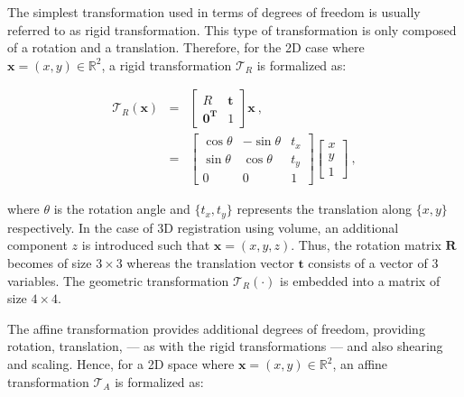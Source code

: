The simplest transformation used in terms of degrees of freedom is usually referred to as rigid transformation.
This type of transformation is only composed of a rotation and a translation.
Therefore, for the 2D case where $\mathbf{x} = (x,y) \in \mathbb{R}^2$, a rigid transformation $\mathcal{T}_R$ is formalized as:

\begin{eqnarray}
	\mathcal{T}_R(\mathbf{x}) & = & \begin{bmatrix}
		R & \mathbf{t} \\
		\mathbf{0^T} & 1
	\end{bmatrix} \mathbf{x} \ , \nonumber \\
	& = & \begin{bmatrix}
		\cos \theta & -\sin \theta & t_x \\
		\sin \theta & \cos \theta & t_y \\
		0 & 0 & 1
	\end{bmatrix}\begin{bmatrix}
		x \\
		y \\
		1
	\end{bmatrix} \ , \label{eq:rigtra} %
\end{eqnarray}

\noindent where $\theta$ is the rotation angle and $\{ t_x,t_y \}$ represents the translation along $\{x,y\}$ respectively.
In the case of 3D registration using volume, an additional component $z$ is introduced such that $\mathbf{x} = (x,y,z)$.
Thus, the rotation matrix $\mathbf{R}$ becomes of size $3 \times 3$ whereas the translation vector $\mathbf{t}$ consists of a vector of 3 variables. 
The geometric transformation $\mathcal{T}_R(\cdot)$ is embedded into a matrix of size $4 \times 4$.

The affine transformation provides additional degrees of freedom, providing rotation, translation, --- as with the rigid transformations --- and also shearing and scaling.
Hence, for a 2D space where $\mathbf{x} = (x,y) \in \mathbb{R}^2$, an affine transformation $\mathcal{T}_A$ is formalized as: 

